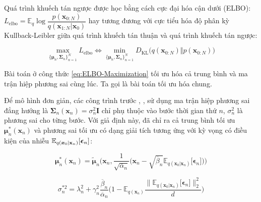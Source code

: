 \documentclass[14pt, a4paper]{article}
\numberwithin{equation}{section}
\numberwithin{figure}{section}
\numberwithin{dl}{section}
\numberwithin{md}{section}
\numberwithin{bd}{section}
\numberwithin{dn}{section}
\numberwithin{hq}{section}
\begin{document}
    Quá trình khuếch tán ngược được học bằng cách cực đại hóa cận dưới (ELBO): $L_{\mathrm{elbo}}=\mathbb{E}_q \log \dfrac{p(\boldsymbol{x}_{0:N})}{q(\boldsymbol{x}_{1:N}\vert \boldsymbol{x}_0)}$ hay tương đương với cực tiểu hóa độ phân kỳ Kullback-Leibler giữa quá trình khuếch tán thuận và quá trình khuếch tán ngược:

    \begin{equation} \label{eq:ELBO-Maximization}
        \max_{\lbrace \boldsymbol{\mu}_n, \boldsymbol{\Sigma}_n \rbrace_{n=1}^N} L_{\mathrm{elbo}} \Leftrightarrow \min_{\lbrace \boldsymbol{\mu}_n, \boldsymbol{\Sigma}_n \rbrace_{n=1}^N} D_{\mathrm{KL}} \big( q(\boldsymbol{x}_{0:N}) \Vert p(\boldsymbol{x}_{0:N}) \big)
    \end{equation}

    Bài toán ở công thức \ref{eq:ELBO-Maximization} tối ưu hóa cả trung bình và ma trận hiệp phương sai cùng lúc. 
    Ta gọi là bài toán tối ưu hóa chung.

    Để mô hình đơn giản, các công trình trước \cite{ho2020denoising}, \cite{song2020denoising}, \cite{bao2021analytic} sử dụng ma trận hiệp phương sai đẳng hướng là $\boldsymbol{\Sigma}_n(\boldsymbol{x}_n)=\sigma_n^2 \boldsymbol{I}$ chỉ phụ thuộc vào bước thời gian thứ $n$, $\sigma_n^2$ là phương sai cho từng bước.
    Với giả định này, \cite{bao2021analytic} đã chỉ ra cả trung bình tối ưu $\boldsymbol{\mu}_n^{\ast} (\boldsymbol{x}_n)$ và phương sai tối ưu có dạng giải tích tương ứng với kỳ vọng có điều kiện của nhiễu $\mathbb{E}_{q( \boldsymbol{x}_0 \vert \bold{x}_n )} \lbrack \boldsymbol{\epsilon}_n \rbrack$:

    \begin{equation} \label{eq:Optimal-Mean}
        \boldsymbol{\mu}_n^{\ast} (\boldsymbol{x}_n)=\tilde{\boldsymbol{\mu}}_n \Bigg( \boldsymbol{x}_n, \dfrac{1}{\sqrt{\overline{\alpha}_n}} \Big( \boldsymbol{x}_n - \sqrt{\overline{\beta}_n} \mathbb{E}_{q(\boldsymbol{x}_0 \vert \boldsymbol{x}_n)} \lbrack \boldsymbol{\epsilon}_n \rbrack \Big) \Bigg)
    \end{equation}

    \begin{equation} \label{eq:Optimal-Isotropic-Variance}
        \sigma_n^{\ast 2}=\lambda_n^2 + \gamma_n^2 \dfrac{\overline{\beta}_n}{\overline{\alpha}_n} \Bigg( 1 - \mathbb{E}_{q(\boldsymbol{x}_n)} \dfrac{\lVert \mathbb{E}_{q(\boldsymbol{x}_0 \vert \boldsymbol{x}_n)} \lbrack \boldsymbol{\epsilon}_n \rbrack\rVert_2^2}{d} \Bigg)
    \end{equation}
\end{document}
